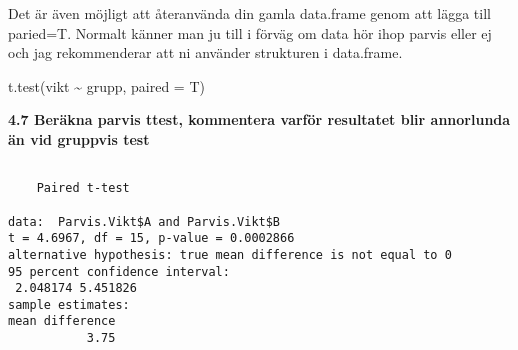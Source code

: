 \documentclass[
  letterpaper,
  DIV=11,
  numbers=noendperiod]{scrartcl}
\newenvironment{Shaded}{\begin{snugshade}}{\end{snugshade}}
\newcommand{\AttributeTok}[1]{\textcolor[rgb]{0.40,0.45,0.13}{#1}}
\newcommand{\CommentTok}[1]{\textcolor[rgb]{0.37,0.37,0.37}{#1}}
\newcommand{\ConstantTok}[1]{\textcolor[rgb]{0.56,0.35,0.01}{#1}}
\newcommand{\ControlFlowTok}[1]{\textcolor[rgb]{0.00,0.23,0.31}{#1}}
\newcommand{\DecValTok}[1]{\textcolor[rgb]{0.68,0.00,0.00}{#1}}
\newcommand{\FloatTok}[1]{\textcolor[rgb]{0.68,0.00,0.00}{#1}}
\newcommand{\FunctionTok}[1]{\textcolor[rgb]{0.28,0.35,0.67}{#1}}
\newcommand{\NormalTok}[1]{\textcolor[rgb]{0.00,0.23,0.31}{#1}}
\newcommand{\OtherTok}[1]{\textcolor[rgb]{0.00,0.23,0.31}{#1}}
\newcommand{\SpecialCharTok}[1]{\textcolor[rgb]{0.37,0.37,0.37}{#1}}
\newcommand{\StringTok}[1]{\textcolor[rgb]{0.13,0.47,0.30}{#1}}
\begin{document}
Det är även möjligt att återanvända din gamla data.frame genom att lägga
till paried=T. Normalt känner man ju till i förväg om data hör ihop
parvis eller ej och jag rekommenderar att ni använder strukturen i
data.frame.

t.test(vikt \textasciitilde{} grupp, paired = T)

\textbf{4.7 Beräkna parvis ttest, kommentera varför resultatet blir
annorlunda än vid gruppvis test}

\begin{Shaded}
\end{Shaded}

\begin{verbatim}

    Paired t-test

data:  Parvis.Vikt$A and Parvis.Vikt$B
t = 4.6967, df = 15, p-value = 0.0002866
alternative hypothesis: true mean difference is not equal to 0
95 percent confidence interval:
 2.048174 5.451826
sample estimates:
mean difference 
           3.75 
\end{verbatim}

\begin{Shaded}
\end{Shaded}
\end{document}
